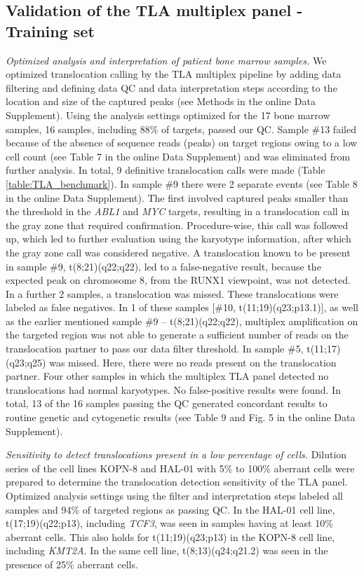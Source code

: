 \subsection{Validation of the TLA multiplex panel - Training set}
\textsl{Optimized analysis and interpretation of patient bone marrow samples.}
We optimized translocation calling by the TLA multiplex pipeline by adding data filtering and defining data QC and data interpretation steps according to the location and size of the captured peaks (see Methods in the online Data Supplement). 
Using the analysis settings optimized for the 17 bone marrow samples, 16 samples, including 88\% of targets, passed our QC. 
Sample \#13 failed because of the absence of sequence reads (peaks) on target regions owing to a low cell count (see Table 7 in the online Data Supplement) and was eliminated from further analysis. 
In total, 9 definitive translocation calls were made (Table \ref{table:TLA_benchmark}). In sample \#9 there were 2 separate events (see Table 8 in the online Data Supplement).
The first involved captured peaks smaller than the threshold in the \textsl{ABL1} and \textsl{MYC} targets, resulting in a translocation call in the gray zone that required confirmation. 
Procedure-wise, this call was followed up, which led to further evaluation using the karyotype information, after which the gray zone call was considered negative. 
A translocation known to be present in sample \#9, t(8;21)(q22;q22), led to a false-negative result, because the expected peak on chromosome 8, from the RUNX1 viewpoint, was not detected. 
In a further 2 samples, a translocation was missed. 
These translocations were labeled as false negatives. 
In 1 of these samples [\#10, t(11;19)(q23;p13.1)], as well as the earlier mentioned sample \#9 -- t(8;21)(q22;q22), multiplex amplification on the targeted region was not able to generate a sufficient number of reads on the translocation partner to pass our data filter threshold. 
In sample \#5, t(11;17)(q23;q25) was missed.
Here, there were no reads present on the translocation partner. 
Four other samples in which the multiplex TLA panel detected no translocations had normal karyotypes. 
No false-positive results were found.
In total, 13 of the 16 samples passing the QC generated concordant results to routine genetic and cytogenetic results (see Table 9 and Fig. 5 in the online Data Supplement).

\hfill %

\noindent\textsl{Sensitivity to detect translocations present in a low percentage of cells.}
Dilution series of the cell lines KOPN-8 and HAL-01 with 5\% to 100\% aberrant cells were prepared to determine the translocation detection sensitivity of the TLA panel. 
Optimized analysis settings using the filter and interpretation steps labeled all samples and 94\% of targeted regions as passing QC. 
In the HAL-01 cell line, t(17;19)(q22;p13), including \textsl{TCF3}, was seen in samples having at least 10\% aberrant cells. 
This also holds for t(11;19)(q23;p13) in the KOPN-8 cell line, including \textsl{KMT2A}. In the same cell line, t(8;13)(q24;q21.2) was seen in the presence of 25\% aberrant cells. 

